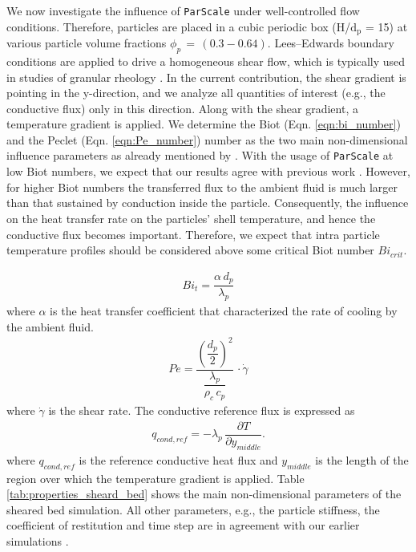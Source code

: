 \documentclass{particles2015}
\begin{document}
We now investigate the influence of \texttt{ParScale} under well-controlled flow conditions. Therefore, particles are placed in a cubic periodic box (H/$\text{d}_\text{p}$ = 15) at various particle volume fractions $\phi_p \, =  \, (0.3 - 0.64)$. Lees–Edwards boundary conditions are applied to drive a homogeneous shear flow, which is typically used in studies of granular rheology \cite{Chialvo2012}. In the current contribution, the shear gradient is pointing in the y-direction, and we analyze all quantities of interest (e.g., the conductive flux) only in this direction. Along with the shear gradient, a temperature gradient is applied. We determine the  Biot (Eqn. \ref{eqn:bi_number}) and the Peclet (Eqn. \ref{eqn:Pe_number}) number as the two main non-dimensional influence parameters as already mentioned by \cite{Mohan2014}. With the usage of \texttt{ParScale} at low Biot numbers, we expect that our results agree with previous work \cite{Mohan2014}. However, for higher Biot numbers the transferred flux to the ambient fluid is much larger than that sustained by conduction inside the particle. Consequently, the influence on the heat transfer rate on the particles' shell temperature, and hence the conductive flux becomes important. Therefore, we expect that intra particle temperature profiles should be considered above some critical Biot number $Bi_{crit}$.

\begin{align}
Bi_t = \dfrac{\alpha\, d_p}{\lambda_p}
\label{eqn:bi_number}
\end{align}
where $\alpha$ is the heat transfer coefficient that characterized the rate of cooling by the ambient fluid.
\begin{align}
Pe = \dfrac{\left(\dfrac{d_p}{2}\right)^2}{\dfrac{\lambda_p}{\rho_c \, c_p}} \, \cdot \dot{\gamma}
\label{eqn:Pe_number}
\end{align}  
where $\dot{\gamma}$ is the shear rate. The conductive reference flux is expressed as \cite{Chialvo2012}
\begin{align}
q_{cond,ref} = - \lambda_p \, \dfrac{\partial T}{\partial y_{middle}}.
\end{align}
where $q_{cond,ref}$ is the reference conductive heat flux and $y_{middle}$ is the length of the region over which the temperature gradient is applied. Table \ref{tab:properties_sheard_bed} shows the main non-dimensional parameters of the sheared bed simulation.  All other parameters, e.g., the particle stiffness, the coefficient of restitution and time step are in agreement with our earlier simulations \cite{Mohan2014}.
\end{document}
